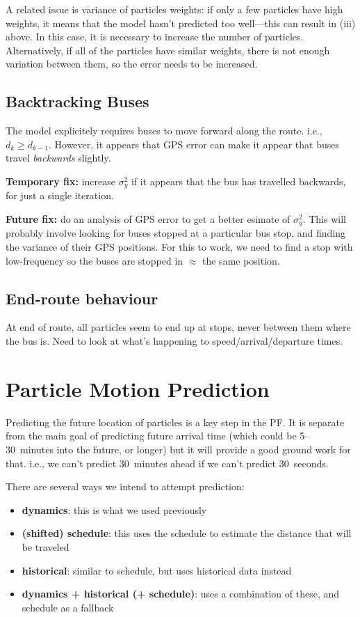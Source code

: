 \documentclass[10pt,a4paper]{article}
\begin{document}
A related issue is variance of particles weights: if only a few particles have high weights, it means that 
the model hasn't predicted too well---this can result in (iii) above. 
In this case, it is necessary to increase the number of particles.
Alternatively, if all of the particles have similar weights, there is not enough variation between them,
so the error needs to be increased.


\subsection{Backtracking Buses}

The model explicitely requires buses to move forward along the route. 
i.e., $d_k \geq d_{k-1}$.
However, it appears that GPS error can make it appear that buses travel \emph{backwards} slightly.

\textbf{Temporary fix:} increase $\sigma_y^2$ if it appears that the bus has travelled backwards, 
for just a single iteration.

\textbf{Future fix:} do an analysis of GPS error to get a better esimate of $\sigma_y^2$.
This will probably involve looking for buses stopped at a particular bus stop, 
and finding the variance of their GPS positions.
For this to work, we need to find a stop with low-frequency so the buses are stopped in $\approx$ the same position.



\subsection{End-route behaviour}

At end of route, all particles seem to end up at stops, never between them where the bus is.
Need to look at what's happening to speed/arrival/departure times.




\section{Particle Motion Prediction}
\label{sec:particle-prediction}

Predicting the future location of particles is a key step in the PF. 
It is separate from the main goal of predicting future arrival time 
(which could be 5--30~minutes into the future, or longer)
but it will provide a good ground work for that.
i.e., we can't predict 30~minutes ahead if we can't predict 30~seconds.

There are several ways we intend to attempt prediction:
\begin{itemize}
\item \textbf{dynamics}: this is what we used previously
\item \textbf{(shifted) schedule}: this uses the schedule to estimate the distance that will be traveled
\item \textbf{historical}: similar to schedule, but uses historical data instead
\item \textbf{dynamics + historical (+ schedule)}: uses a combination of these, and schedule as a fallback
\end{itemize}
\end{document}
